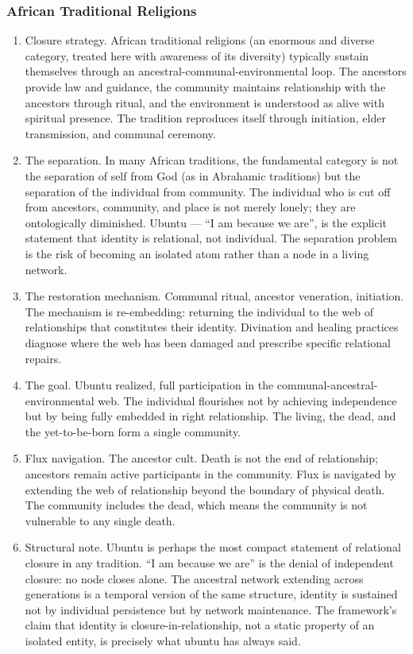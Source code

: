 \documentclass[
]{article}
\providecommand{\tightlist}{%
  \setlength{\itemsep}{0pt}\setlength{\parskip}{0pt}}
\begin{document}
\subsubsection{African Traditional
Religions}\label{african-traditional-religions}

\begin{enumerate}
\def\labelenumi{\arabic{enumi}.}
\setcounter{enumi}{59}
\tightlist
\item
  Closure strategy. African traditional religions (an enormous and
  diverse category, treated here with awareness of its diversity)
  typically sustain themselves through an
  ancestral-communal-environmental loop. The ancestors provide law and
  guidance, the community maintains relationship with the ancestors
  through ritual, and the environment is understood as alive with
  spiritual presence. The tradition reproduces itself through
  initiation, elder transmission, and communal ceremony.
\item
  The separation. In many African traditions, the fundamental category
  is not the separation of self from God (as in Abrahamic traditions)
  but the separation of the individual from community. The individual
  who is cut off from ancestors, community, and place is not merely
  lonely; they are ontologically diminished. Ubuntu --- ``I am because
  we are'', is the explicit statement that identity is relational, not
  individual. The separation problem is the risk of becoming an isolated
  atom rather than a node in a living network.
\item
  The restoration mechanism. Communal ritual, ancestor veneration,
  initiation. The mechanism is re-embedding: returning the individual to
  the web of relationships that constitutes their identity. Divination
  and healing practices diagnose where the web has been damaged and
  prescribe specific relational repairs.
\item
  The goal. Ubuntu realized, full participation in the
  communal-ancestral- environmental web. The individual flourishes not
  by achieving independence but by being fully embedded in right
  relationship. The living, the dead, and the yet-to-be-born form a
  single community.
\item
  Flux navigation. The ancestor cult. Death is not the end of
  relationship; ancestors remain active participants in the community.
  Flux is navigated by extending the web of relationship beyond the
  boundary of physical death. The community includes the dead, which
  means the community is not vulnerable to any single death.
\item
  Structural note. Ubuntu is perhaps the most compact statement of
  relational closure in any tradition. ``I am because we are'' is the
  denial of independent closure: no node closes alone. The ancestral
  network extending across generations is a temporal version of the same
  structure, identity is sustained not by individual persistence but by
  network maintenance. The framework's claim that identity is
  closure-in-relationship, not a static property of an isolated entity,
  is precisely what ubuntu has always said.
\end{enumerate}
\end{document}
